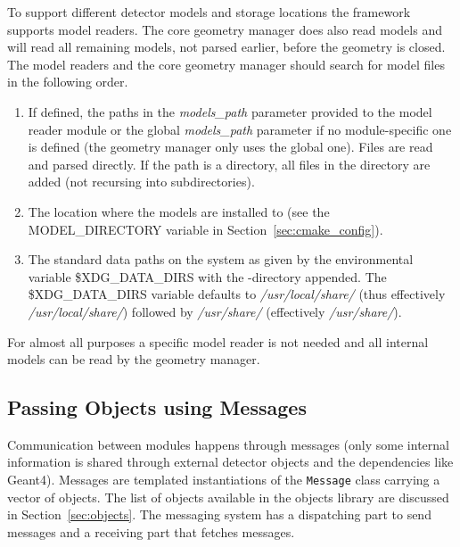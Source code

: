 To support different detector models and storage locations the framework supports model readers.
The core geometry manager does also read models and will read all remaining models, not parsed earlier, before the geometry is closed.
The model readers and the core geometry manager should search for model files in the following order.
\begin{enumerate}
\item If defined, the paths in the \textit{models\_path} parameter provided to the model reader module or the global \textit{models\_path} parameter if no module-specific one is defined (the geometry manager only uses the global one).
Files are read and parsed directly.
If the path is a directory, all files in the directory are added (not recursing into subdirectories).
\item The location where the models are installed to (see the MODEL\_DIRECTORY variable in Section~\ref{sec:cmake_config}).
\item The standard data paths on the system as given by the environmental variable \$XDG\_DATA\_DIRS with the \project-directory appended.
The \$XDG\_DATA\_DIRS variable defaults to \textit{/usr/local/share/} (thus effectively \textit{/usr/local/share/\project}) followed by \textit{/usr/share/} (effectively \textit{/usr/share/\project}).
\end{enumerate}
For almost all purposes a specific model reader is not needed and all internal models can be read by the geometry manager.


\subsection{Passing Objects using Messages}
\label{sec:objects_messages}
Communication between modules happens through messages (only some internal information is shared through external detector objects and the dependencies like Geant4).
Messages are templated instantiations of the \texttt{Message} class carrying a vector of objects.
The list of objects available in the \apsq objects library are discussed in Section~\ref{sec:objects}.
The messaging system has a dispatching part to send messages and a receiving part that fetches messages.

